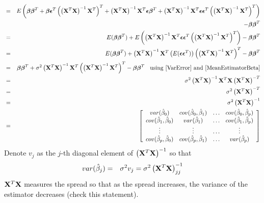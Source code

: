 \documentclass[11pt]{article}
\theoremstyle{remark}
\begin{document}
\begin{eqnarray}
&=& E\left(\boldsymbol{\beta}\boldsymbol{\beta}^T  + \boldsymbol{\beta} \boldsymbol{\epsilon}^T\left(\left(\bold{X}^T\bold{X}\right)^{-1}\bold{X}^T\right)^T + \left(\bold{X}^T\bold{X}\right)^{-1}\bold{X}^T\boldsymbol{\epsilon}\boldsymbol{\beta}^T + \left(\bold{X}^T\bold{X}\right)^{-1}\bold{X}^T\boldsymbol{\epsilon}\boldsymbol{\epsilon}^T\left(\left(\bold{X}^T\bold{X}\right)^{-1}\bold{X}^T\right)^T\right) \nonumber\\
&& - \boldsymbol{\beta}\boldsymbol{\beta}^T\nonumber\\
&=& E(\boldsymbol{\beta}\boldsymbol{\beta}^T) + E\left(\left(\bold{X}^T\bold{X}\right)^{-1}\bold{X}^T\boldsymbol{\epsilon}\boldsymbol{\epsilon}^T\left(\left(\bold{X}^T\bold{X}\right)^{-1}\bold{X}^T\right)^T\right) - \boldsymbol{\beta}\boldsymbol{\beta}^T\nonumber\\
&=& E(\boldsymbol{\beta}\boldsymbol{\beta}^T) + \left(\bold{X}^T\bold{X}\right)^{-1}\bold{X}^T\left(E(\boldsymbol{\epsilon}\boldsymbol{\epsilon}^T)\right)\left(\left(\bold{X}^T\bold{X}\right)^{-1}\bold{X}^T\right)^T - \boldsymbol{\beta}\boldsymbol{\beta}^T\nonumber\\
&=& \boldsymbol{\beta}\boldsymbol{\beta}^T + \sigma^2 \left(\bold{X}^T\bold{X}\right)^{-1}\bold{X}^T\left(\left(\bold{X}^T\bold{X}\right)^{-1}\bold{X}^T\right)^T - \boldsymbol{\beta}\boldsymbol{\beta}^T\:\:\:\:\text{using \eqref{VarError} and \eqref{MeanEstimatorBeta}}\nonumber\\
&=& \sigma^2 \left(\bold{X}^T\bold{X}\right)^{-1}\bold{X}^T\bold{X}\left(\bold{X}^T\bold{X}\right)^{-T}\nonumber\\
&=& \sigma^2 \left(\bold{X}^T\bold{X}\right)^{-T}\nonumber\\
&=& \sigma^2 \left(\bold{X}^T\bold{X}\right)^{-1}\label{VarEstimator}\\
&=&
\left[
\begin{array}{cccc}
var(\hat{\beta}_0) & cov(\hat{\beta}_0,\hat{\beta}_1) & \hdots & cov(\hat{\beta}_0,\hat{\beta}_{p})\\
cov(\hat{\beta}_1,\hat{\beta}_0) & var(\hat{\beta}_1) & \hdots & cov(\hat{\beta}_1,\hat{\beta}_{p})\\
\vdots & \vdots & \hdots & \vdots \\
cov(\hat{\beta}_p,\hat{\beta}_0) &  cov(\hat{\beta}_p,\hat{\beta}_1)& \hdots & var(\hat{\beta}_p)
\end{array}
\right]
\label{VarEstimatorMatrixForm}
\end{eqnarray}
Denote $v_j$ as the $j$-th diagonal element of $\left(\bold{X}^T\bold{X}\right)^{-1}$ so that
\begin{eqnarray}
var(\hat{\beta}_j) &=& \sigma^2 v_j = \sigma^2 \left(\bold{X}^T\bold{X}\right)^{-1}_{jj}\label{VarianceEstimatorDiag}
\end{eqnarray}
$\bold{X}^T\bold{X}$ measures the spread so that as the spread increases, the variance of the estimator decreases (check this statement).
\end{document}
